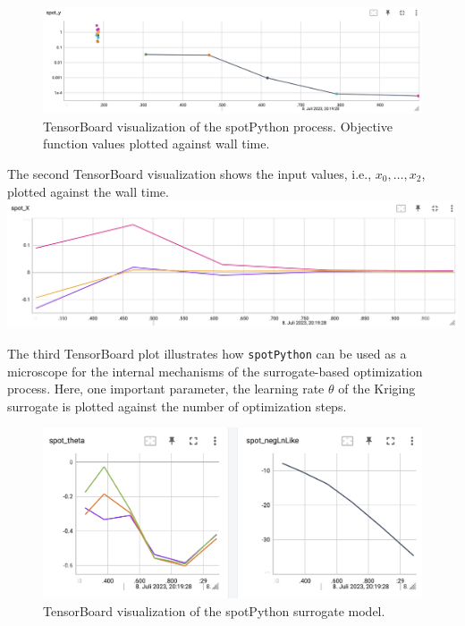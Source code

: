 \documentclass[
  letterpaper,
  DIV=11,
  numbers=noendperiod]{scrreprt}
\begin{document}
\begin{figure}

{\centering \includegraphics{figures_static/02_tensorboard_01.png}

}

\caption{TensorBoard visualization of the spotPython process. Objective
function values plotted against wall time.}

\end{figure}

The second TensorBoard visualization shows the input values, i.e.,
\(x_0, \ldots, x_2\), plotted against the wall time.
\includegraphics{figures_static/02_tensorboard_02.png}

The third TensorBoard plot illustrates how \texttt{spotPython} can be
used as a microscope for the internal mechanisms of the surrogate-based
optimization process. Here, one important parameter, the learning rate
\(\theta\) of the Kriging surrogate is plotted against the number of
optimization steps.

\begin{figure}

{\centering \includegraphics[width=1\textwidth,height=\textheight]{figures_static/02_tensorboard_03.png}

}

\caption{TensorBoard visualization of the spotPython surrogate model.}

\end{figure}
\end{document}
